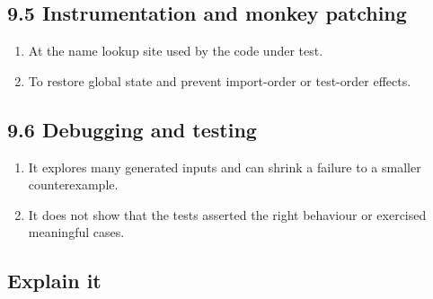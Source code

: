 \documentclass[11pt]{article}
\begin{document}
\begin{keepsection}
\begin{keepsection}
\end{keepsection}
\begin{keepsection}\subsection{9.5 Instrumentation and monkey patching}

\begin{enumerate}
\item At the name lookup site used by the code under test.
\item To restore global state and prevent import-order or test-order effects.
\end{enumerate}

\end{keepsection}
\begin{keepsection}\subsection{9.6 Debugging and testing}

\begin{enumerate}
\item It explores many generated inputs and can shrink a failure to a smaller counterexample.
\item It does not show that the tests asserted the right behaviour or exercised meaningful cases.
\end{enumerate}

\end{keepsection}
\begin{keepsection}\subsection{Explain it}


\end{keepsection}
\end{keepsection}
\end{document}
